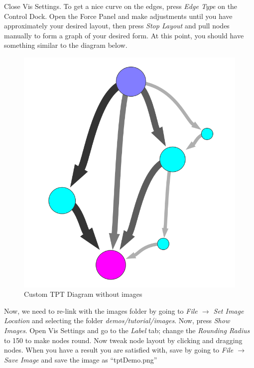 \documentclass[10pt,a4paper]{report}
\begin{document}
Close Vis Settings. To get a nice curve on the edges, press \emph{Edge Type} on the Control Dock. Open the Force Panel and make adjustments until you have approximately your desired layout, then press \emph{Stop Layout} and pull nodes manually to form a graph of your desired form. At this point, you should have something similar to the diagram below. 

\begin{figure}[h]
\includegraphics[scale=.3]{basicTPT.png}
\caption{Custom TPT Diagram without images}
\end{figure}

Now, we need to re-link with the images folder by going to \emph{File $\rightarrow$ Set Image Location} and selecting the folder \emph{demos/tutorial/images}. Now, press \emph{Show Images}. Open Vis Settings and go to the \emph{Label} tab; change the \emph{Rounding Radius} to 150 to make nodes round. Now tweak node layout by clicking and dragging nodes. When you have a result you are satisfied with, save by going to \emph{File $\rightarrow$ Save Image} and save the image as ``tptDemo.png''
\end{document}
